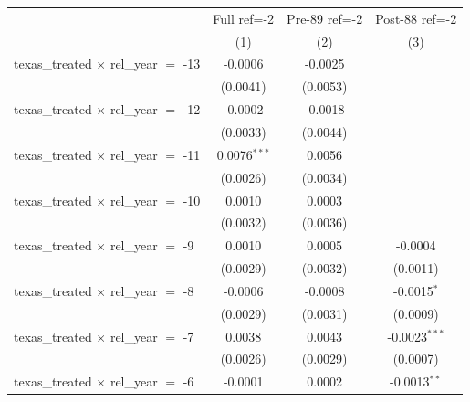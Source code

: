 
\begingroup
\centering
\begin{tabular}{lccc}
   \toprule
                                                & Full ref=-2           & Pre-89 ref=-2          & Post-88 ref=-2 \\   
                                                & (1)                   & (2)                    & (3)\\  
   \midrule 
   texas\_treated $\times$ rel\_year $=$ -13    & -0.0006               & -0.0025                &   \\   
                                                & (0.0041)              & (0.0053)               &   \\   
   texas\_treated $\times$ rel\_year $=$ -12    & -0.0002               & -0.0018                &   \\   
                                                & (0.0033)              & (0.0044)               &   \\   
   texas\_treated $\times$ rel\_year $=$ -11    & 0.0076$^{***}$        & 0.0056                 &   \\   
                                                & (0.0026)              & (0.0034)               &   \\   
   texas\_treated $\times$ rel\_year $=$ -10    & 0.0010                & 0.0003                 &   \\   
                                                & (0.0032)              & (0.0036)               &   \\   
   texas\_treated $\times$ rel\_year $=$ -9     & 0.0010                & 0.0005                 & -0.0004\\   
                                                & (0.0029)              & (0.0032)               & (0.0011)\\   
   texas\_treated $\times$ rel\_year $=$ -8     & -0.0006               & -0.0008                & -0.0015$^{*}$\\   
                                                & (0.0029)              & (0.0031)               & (0.0009)\\   
   texas\_treated $\times$ rel\_year $=$ -7     & 0.0038                & 0.0043                 & -0.0023$^{***}$\\   
                                                & (0.0026)              & (0.0029)               & (0.0007)\\   
   texas\_treated $\times$ rel\_year $=$ -6     & -0.0001               & 0.0002                 & -0.0013$^{**}$\\   

\end{tabular}
